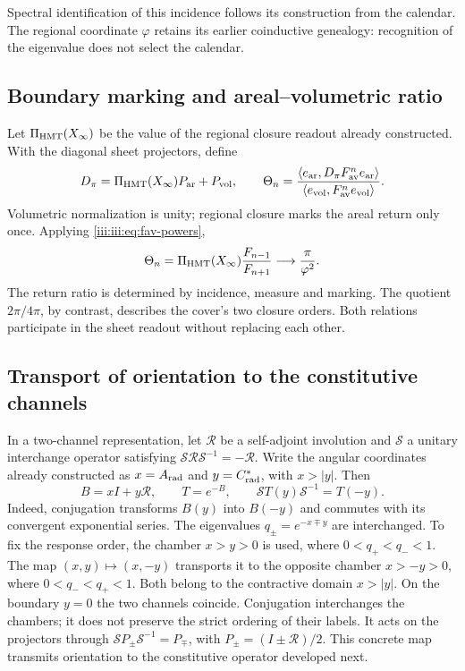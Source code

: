Spectral identification of this incidence follows its construction
from the calendar. The regional coordinate $\varphi$ retains its earlier coinductive
genealogy: recognition of the eigenvalue does not select the calendar.

\subsection{Boundary marking and areal--volumetric ratio}

Let $\Pi_{\rm HMT}(X_\infty)$ be the value of the regional closure readout already
constructed. With the diagonal sheet projectors, define
\begin{equation}
 D_\pi=\Pi_{\rm HMT}(X_\infty)P_{\rm ar}+P_{\rm vol},\qquad
 \Theta_n=
 \frac{\langle e_{\rm ar},D_\pi F_{\rm av}^{n}e_{\rm ar}\rangle}
 {\langle e_{\rm vol},F_{\rm av}^{n}e_{\rm vol}\rangle}.
 \label{iii:iii:eq:marked-return}
\end{equation}
Volumetric normalization is unity; regional closure marks the
areal return only once. Applying \eqref{iii:iii:eq:fav-powers},
\begin{equation}
 \Theta_n=\Pi_{\rm HMT}(X_\infty)\frac{F_{n-1}}{F_{n+1}}
 \longrightarrow\frac{\pi}{\varphi^2}.
 \label{iii:iii:eq:av-limit}
\end{equation}
The return ratio is determined by incidence, measure and marking.
The quotient $2\pi/4\pi$, by contrast, describes the cover's two closure orders.
Both relations participate in the sheet readout without replacing each other.

\subsection{Transport of orientation to the constitutive channels}

In a two-channel representation, let $\mathcal R$ be a self-adjoint
involution and $\mathcal S$ a unitary interchange operator satisfying
$\mathcal S\mathcal R\mathcal S^{-1}=-\mathcal R$. Write the angular coordinates
already constructed as $x=A_{\rm rad}$ and $y=C^*_{\rm rad}$, with $x>|y|$.
Then
\begin{equation}
 B=xI+y\mathcal R,\qquad T=e^{-B},\qquad
 \mathcal ST(y)\mathcal S^{-1}=T(-y).
 \label{iii:iii:eq:channel-conjugation}
\end{equation}
Indeed, conjugation transforms $B(y)$ into $B(-y)$ and commutes with its convergent
exponential series. The eigenvalues $q_\pm=e^{-x\mp y}$ are interchanged.
To fix the response order, the chamber $x>y>0$ is used, where
$0<q_+<q_-<1$. The map $(x,y)\mapsto(x,-y)$ transports it to the
opposite chamber $x>-y>0$, where $0<q_-<q_+<1$. Both belong to the
contractive domain $x>|y|$. On the boundary $y=0$ the two channels coincide.
Conjugation interchanges the chambers; it does not preserve the strict ordering of
their labels. It acts on the projectors through
$\mathcal SP_\pm\mathcal S^{-1}=P_\mp$, with
$P_\pm=(I\pm\mathcal R)/2$.
This concrete map transmits orientation to the constitutive operator
developed next.
